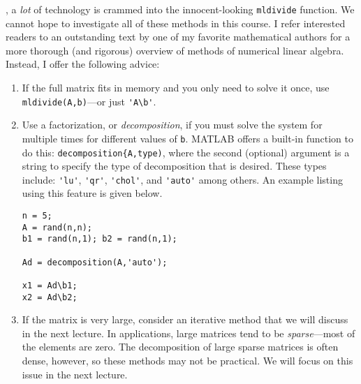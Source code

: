 , a \emph{lot} of technology is crammed into the innocent-looking \lstinline[style=myMatlab]{mldivide} function.  We cannot hope to investigate all of these methods in this course.  I refer interested readers to an outstanding text by one of my favorite mathematical authors for a more thorough (and rigorous) overview of methods of numerical linear algebra.\cite{trefethen2022numerical}  Instead, I offer the following advice:
\begin{enumerate}
\item If the full matrix fits in memory and you only need to solve it once, use \lstinline[style=myMatlab]{mldivide(A,b)}---or just \lstinline[style=myMatlab]{'A\b'}.
\item Use a factorization, or \emph{decomposition}, if you must solve the system for multiple times for different values of \lstinline[style=myMatlab]{b}. MATLAB offers a built-in function to do this: \lstinline[style=myMatlab]{decomposition{A,type)}, where the second (optional) argument is a string to specify the type of decomposition that is desired.  These types include: \lstinline[style=myMatlab]{'lu'}, \lstinline[style=myMatlab]{'qr'}, \lstinline[style=myMatlab]{'chol'}, and \lstinline[style=myMatlab]{'auto'} among others. 
An example listing using this feature is given below.
\begin{lstlisting}[style=myMatlab]
n = 5;
A = rand(n,n);
b1 = rand(n,1); b2 = rand(n,1);

Ad = decomposition(A,'auto');

x1 = Ad\b1;
x2 = Ad\b2;
\end{lstlisting}

\item If the matrix is very large, consider an iterative method that we will discuss in the next lecture.  In applications, large matrices tend to be \emph{sparse}---most of the elements are zero. The decomposition of large sparse matrices is often dense, however, so these methods may not be practical.  We will focus on this issue in the next lecture. 

\end{enumerate}


